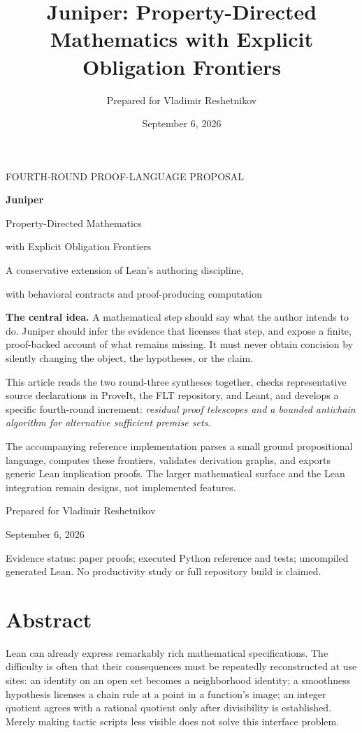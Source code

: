 \documentclass[11pt,a4paper]{article}
\title{Juniper: Property-Directed Mathematics with Explicit Obligation Frontiers}
\author{Prepared for Vladimir Reshetnikov}
\date{September 6, 2026}
\theoremstyle{definition}\newtheorem{definition}[theorem]{Definition}
\theoremstyle{remark}\newtheorem{remark}[theorem]{Remark}
\begin{document}
\begin{titlepage}
\color{Ink}
{\sffamily\small\color{Juniper} FOURTH-ROUND PROOF-LANGUAGE PROPOSAL}\par
\vspace{18mm}
{\sffamily\bfseries\fontsize{49}{54}\selectfont Juniper}\par
\vspace{6mm}
{\sffamily\Large Property-Directed Mathematics\par with Explicit Obligation Frontiers}\par
\vspace{8mm}
{\large A conservative extension of Lean's authoring discipline,\par with behavioral contracts and proof-producing computation}\par
\vspace{12mm}
\begin{principle}
\textbf{The central idea.} A mathematical step should say what the author intends to do. Juniper should infer the evidence that licenses that step, and expose a finite, proof-backed account of what remains missing. It must never obtain concision by silently changing the object, the hypotheses, or the claim.
\end{principle}
\vspace{7mm}
This article reads the two round-three syntheses together, checks representative source declarations in ProveIt, the FLT repository, and Leant, and develops a specific fourth-round increment: \emph{residual proof telescopes and a bounded antichain algorithm for alternative sufficient premise sets}.

The accompanying reference implementation parses a small ground propositional language, computes these frontiers, validates derivation graphs, and exports generic Lean implication proofs. The larger mathematical surface and the Lean integration remain designs, not implemented features.
\vfill
{\sffamily Prepared for Vladimir Reshetnikov\par September 6, 2026}\par
\vspace{4mm}
{\small Evidence status: paper proofs; executed Python reference and tests; uncompiled generated Lean. No productivity study or full repository build is claimed.}
\end{titlepage}

\section*{Abstract}
Lean can already express remarkably rich mathematical specifications. The difficulty is often that their consequences must be repeatedly reconstructed at use sites: an identity on an open set becomes a neighborhood identity; a smoothness hypothesis licenses a chain rule at a point in a function's image; an integer quotient agrees with a rational quotient only after divisibility is established. Merely making tactic scripts less visible does not solve this interface problem.
\end{document}
